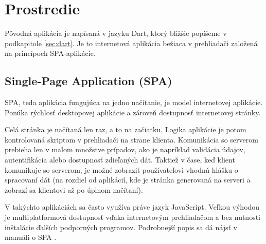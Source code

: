 \chapter{Prostredie}

\label{kap:prostredie} %

Pôvodná aplikácia je napísaná v jazyku Dart, ktorý bližšie popíšeme v podkapitole \ref{sec:dart}. Je to internetová aplikácia bežiaca v prehliadači založená na princípoch SPA-aplikácie.

\section{Single-Page Application (SPA)}
SPA, teda aplikácia fungujúca na jedno načítanie, je model internetovej aplikácie. Ponúka rýchlosť desktopovej aplikácie a zároveň dostupnosť internetovej stránky.

Celá stránka je načítaná len raz, a to na začiatku. Logika aplikácie je potom kontrolovaná skriptom v prehliadači na strane klienta. 
Komunikácia so serverom prebieha len v malom množstve prípadov, ako je napríklad validácia údajov, autentifikácia alebo dostupnosť zdieľaných dát. 
Taktiež v čase, keď klient komunikuje so serverom, je možné zobraziť používateľovi vhodnú hlášku o spracovaní dát (na rozdiel od aplikácií, kde je stránka generovaná na serveri a zobrazí sa klientovi až po úplnom načítaní).

V takýchto aplikáciách sa často využíva práve jazyk JavaScript. Veľkou výhodou je multiplatformová dostupnosť vďaka internetovým prehliadačom a bez nutnosti inštalácie ďalších podporných programov. Podrobnejší popis sa dá nájsť v manuáli o SPA \cite{SPA}.


